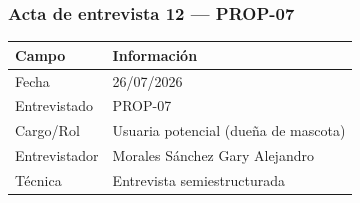 \documentclass[journal,onecolumn]{IEEEtran}
\begin{document}
	
	\subsubsection*{Acta de entrevista 12 --- PROP-07}
	
	\begin{table}[H]
		\centering\small
		\begin{tabularx}{\textwidth}{@{}l X@{}}
			\toprule
			\textbf{Campo} & \textbf{Información} \\
			\midrule
			
			Fecha & 26/07/2026 \\
			
			Entrevistado & PROP-07 \\
			
			Cargo/Rol & Usuaria potencial (dueña de mascota) \\
			
			Entrevistador & Morales Sánchez Gary Alejandro \\
			
			Técnica & Entrevista semiestructurada \\
			
			\bottomrule
		\end{tabularx}
	\end{table}
	
\end{document}
